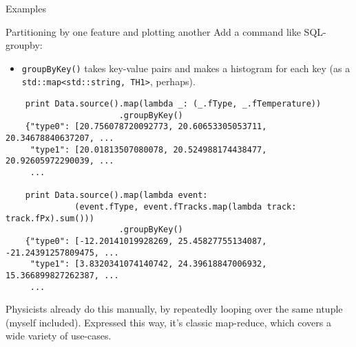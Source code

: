 \documentclass{beamer}
\begin{document}
\begin{frame}[fragile]{Examples}
\begin{block}{Partitioning by one feature and plotting another}
Add a command like SQL-groupby:
\begin{itemize}
\item {\tt groupByKey()} takes key-value pairs and makes a histogram for each key (as a {\tt std::map<std::string, TH1>}, perhaps).
\end{itemize}
\vspace{-0.5\baselineskip}
{\scriptsize \begin{verbatim}
    print Data.source().map(lambda _: (_.fType, _.fTemperature))
                       .groupByKey()
    {"type0": [20.756078720092773, 20.60653305053711, 20.34678840637207, ...
     "type1": [20.01813507080078, 20.524988174438477, 20.92605972290039, ...
     ...

    print Data.source().map(lambda event:
              (event.fType, event.fTracks.map(lambda track: track.fPx).sum()))
                       .groupByKey()
    {"type0": [-12.20141019928269, 25.45827755134087, -21.24391257809475, ...
     "type1": [3.8320341074140742, 24.39618847006932, 15.366899827262387, ...
     ...
\end{verbatim}}
\vspace{-0.5\baselineskip}
Physicists already do this manually, by repeatedly looping over the same ntuple (myself included). Expressed this way, it's classic map-reduce, which covers a wide variety of use-cases.
\end{block}
\end{frame}
\end{document}
